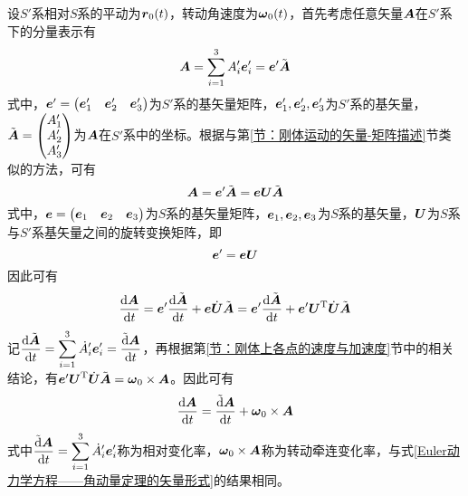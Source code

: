 设$S'$系相对$S$系的平动为$\boldsymbol{r}_0(t)$，转动角速度为$\boldsymbol{\omega}_0(t)$，首先考虑任意矢量$\boldsymbol{A}$在$S'$系下的分量表示有
\begin{equation*}
	\boldsymbol{A} = \sum_{i=1}^3 A'_i \boldsymbol{e}'_i = \boldsymbol{e}' \tilde{\boldsymbol{A}}
\end{equation*}
式中，$\boldsymbol{e}' = \begin{pmatrix} \boldsymbol{e}'_1 & \boldsymbol{e}'_2 & \boldsymbol{e}'_3 \end{pmatrix}$为$S'$系的基矢量矩阵，$\boldsymbol{e}'_1,\boldsymbol{e}'_2,\boldsymbol{e}'_3$为$S'$系的基矢量，$\tilde{\boldsymbol{A}} = \begin{pmatrix} A'_1 \\ A'_2 \\ A'_3 \end{pmatrix}$为$\boldsymbol{A}$在$S'$系中的坐标。根据与第\ref{节：刚体运动的矢量-矩阵描述}节类似的方法，可有
\begin{equation*}
	\boldsymbol{A} = \boldsymbol{e}' \tilde{\boldsymbol{A}} = \boldsymbol{e} \boldsymbol{U} \tilde{\boldsymbol{A}}
\end{equation*}
式中，$\boldsymbol{e} = \begin{pmatrix} \boldsymbol{e}_1 & \boldsymbol{e}_2 & \boldsymbol{e}_3 \end{pmatrix}$为$S$系的基矢量矩阵，$\boldsymbol{e}_1,\boldsymbol{e}_2,\boldsymbol{e}_3$为$S$系的基矢量，$\boldsymbol{U}$为$S$系与$S'$系基矢量之间的旋转变换矩阵，即
\begin{equation*}
	\boldsymbol{e}' = \boldsymbol{e} \boldsymbol{U}
\end{equation*}
因此可有
\begin{equation*}
	\frac{\mathrm{d} \boldsymbol{A}}{\mathrm{d} t} = \boldsymbol{e}' \frac{\mathrm{d} \tilde{\boldsymbol{A}}}{\mathrm{d} t} + \boldsymbol{e} \dot{\boldsymbol{U}} \tilde{\boldsymbol{A}} = \boldsymbol{e}' \frac{\mathrm{d} \tilde{\boldsymbol{A}}}{\mathrm{d} t} + \boldsymbol{e}' \boldsymbol{U}^{\mathrm{T}} \dot{\boldsymbol{U}} \tilde{\boldsymbol{A}}
\end{equation*}
记$\displaystyle \frac{\mathrm{d} \tilde{\boldsymbol{A}}}{\mathrm{d} t} = \sum_{i=1}^3 \dot{A}'_i \boldsymbol{e}'_i = \frac{\tilde{\mathrm{d}} \boldsymbol{A}}{\mathrm{d} t}$，再根据第\ref{节：刚体上各点的速度与加速度}节中的相关结论，有$\boldsymbol{e}' \boldsymbol{U}^{\mathrm{T}} \dot{\boldsymbol{U}} \tilde{\boldsymbol{A}} = \boldsymbol{\omega}_0 \times \boldsymbol{A}$。因此可有
\begin{equation}
	\frac{\mathrm{d} \boldsymbol{A}}{\mathrm{d} t} = \frac{\tilde{\mathrm{d}} \boldsymbol{A}}{\mathrm{d} t} + \boldsymbol{\omega}_0 \times \boldsymbol{A}
	\label{相对变化率与绝对变化率的关系}
\end{equation}
式中$\displaystyle \frac{\tilde{\mathrm{d}} \boldsymbol{A}}{\mathrm{d} t} = \sum_{i=1}^3 \dot{A}'_i \boldsymbol{e}'_i$称为{\heiti 相对变化率}，$\boldsymbol{\omega}_0 \times \boldsymbol{A}$称为{\heiti 转动牵连变化率}，与式\eqref{Euler动力学方程——角动量定理的矢量形式}的结果相同。

